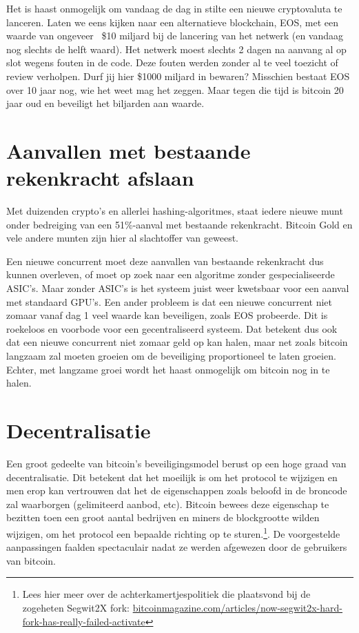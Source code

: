 \documentclass[
  letterpaper,
]{scrbook}
\begin{document}
Het is haast onmogelijk om vandaag de dag in stilte een nieuwe
cryptovaluta te lanceren. Laten we eens kijken naar een alternatieve
blockchain, EOS, met een waarde van ongeveer ~\$10 miljard bij de
lancering van het netwerk (en vandaag nog slechts de helft waard). Het
netwerk moest slechts 2 dagen na aanvang al op slot wegens fouten in de
code. Deze fouten werden zonder al te veel toezicht of review verholpen.
Durf jij hier \$1000 miljard in bewaren? Misschien bestaat EOS over 10
jaar nog, wie het weet mag het zeggen. Maar tegen die tijd is bitcoin 20
jaar oud en beveiligt het biljarden aan waarde.

\hypertarget{aanvallen-met-bestaande-rekenkracht-afslaan}{%
\section{Aanvallen met bestaande rekenkracht
afslaan}\label{aanvallen-met-bestaande-rekenkracht-afslaan}}

Met duizenden crypto's en allerlei hashing-algoritmes, staat iedere
nieuwe munt onder bedreiging van een 51\%-aanval met bestaande
rekenkracht. Bitcoin Gold en vele andere munten zijn hier al slachtoffer
van geweest.

Een nieuwe concurrent moet deze aanvallen van bestaande rekenkracht dus
kunnen overleven, of moet op zoek naar een algoritme zonder
gespecialiseerde ASIC's. Maar zonder ASIC's is het systeem juist weer
kwetsbaar voor een aanval met standaard GPU's. Een ander probleem is dat
een nieuwe concurrent niet zomaar vanaf dag 1 veel waarde kan
beveiligen, zoals EOS probeerde. Dit is roekeloos en voorbode voor een
gecentraliseerd systeem. Dat betekent dus ook dat een nieuwe concurrent
niet zomaar geld op kan halen, maar net zoals bitcoin langzaam zal
moeten groeien om de beveiliging proportioneel te laten groeien. Echter,
met langzame groei wordt het haast onmogelijk om bitcoin nog in te
halen.

\hypertarget{decentralisatie}{%
\section{Decentralisatie}\label{decentralisatie}}

Een groot gedeelte van bitcoin's beveiligingsmodel berust op een hoge
graad van decentralisatie. Dit betekent dat het moeilijk is om het
protocol te wijzigen en men erop kan vertrouwen dat het de eigenschappen
zoals beloofd in de broncode zal waarborgen (gelimiteerd aanbod, etc).
Bitcoin bewees deze eigenschap te bezitten toen een groot aantal
bedrijven en miners de blockgrootte wilden wijzigen, om het protocol een
bepaalde richting op te sturen.\footnote{Lees hier meer over de
  achterkamertjespolitiek die plaatsvond bij de zogeheten Segwit2X fork:
  \href{https://bitcoinmagazine.com/articles/now-segwit2x-hard-fork-has-really-failed-activate}{bitcoinmagazine.com/articles/now-segwit2x-hard-fork-has-really-failed-activate}}.
De voorgestelde aanpassingen faalden spectaculair nadat ze werden
afgewezen door de gebruikers van bitcoin.
\end{document}
